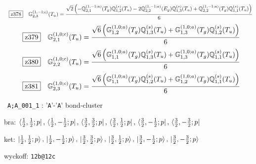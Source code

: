 \documentclass[fleqn,10pt,landscape]{jsarticle}
\begin{document}
\begin{dmath*}
\hspace*{3mm}\fbox{z378}\quad \mathbb{G}_{2,3}^{(1,-1;c)}(T_{u})=\frac{\sqrt{2} \left(- \mathbb{Q}_{2,1}^{(1,-1;a)}(T_{g}) \mathbb{Q}_{1,2}^{(s)}(T_{u}) - 2 \mathbb{Q}_{2,2}^{(1,-1;a)}(E_{g}) \mathbb{Q}_{1,3}^{(s)}(T_{u}) + \mathbb{Q}_{2,2}^{(1,-1;a)}(T_{g}) \mathbb{Q}_{1,1}^{(s)}(T_{u})\right)}{6}
\end{dmath*}
\begin{dmath*}
\hspace*{3mm}\fbox{z379}\quad \mathbb{G}_{2,1}^{(1,0;c)}(T_{u})=\frac{\sqrt{6} \left(\mathbb{G}_{1,2}^{(1,0;a)}(T_{g}) \mathbb{Q}_{1,3}^{(s)}(T_{u}) + \mathbb{G}_{1,3}^{(1,0;a)}(T_{g}) \mathbb{Q}_{1,2}^{(s)}(T_{u})\right)}{6}
\end{dmath*}
\begin{dmath*}
\hspace*{3mm}\fbox{z380}\quad \mathbb{G}_{2,2}^{(1,0;c)}(T_{u})=\frac{\sqrt{6} \left(\mathbb{G}_{1,1}^{(1,0;a)}(T_{g}) \mathbb{Q}_{1,3}^{(s)}(T_{u}) + \mathbb{G}_{1,3}^{(1,0;a)}(T_{g}) \mathbb{Q}_{1,1}^{(s)}(T_{u})\right)}{6}
\end{dmath*}
\begin{dmath*}
\hspace*{3mm}\fbox{z381}\quad \mathbb{G}_{2,3}^{(1,0;c)}(T_{u})=\frac{\sqrt{6} \left(\mathbb{G}_{1,1}^{(1,0;a)}(T_{g}) \mathbb{Q}_{1,2}^{(s)}(T_{u}) + \mathbb{G}_{1,2}^{(1,0;a)}(T_{g}) \mathbb{Q}_{1,1}^{(s)}(T_{u})\right)}{6}
\end{dmath*}
\vspace{5mm}

\noindent\textbullet\, \texttt{A;A_001_1} : '\texttt{A}'-'\texttt{A}' bond-cluster

\noindent\quad * bra: $\bra{\frac{1}{2},\frac{1}{2};p},\, \bra{\frac{1}{2},- \frac{1}{2};p},\, \bra{\frac{3}{2},\frac{3}{2};p},\, \bra{\frac{3}{2},\frac{1}{2};p},\, \bra{\frac{3}{2},- \frac{1}{2};p},\, \bra{\frac{3}{2},- \frac{3}{2};p}$

\noindent\quad * ket: $\ket{\frac{1}{2},\frac{1}{2};p},\, \ket{\frac{1}{2},- \frac{1}{2};p},\, \ket{\frac{3}{2},\frac{3}{2};p},\, \ket{\frac{3}{2},\frac{1}{2};p},\, \ket{\frac{3}{2},- \frac{1}{2};p},\, \ket{\frac{3}{2},- \frac{3}{2};p}$

\noindent\quad * wyckoff: \texttt{12b@12c}
\end{document}
